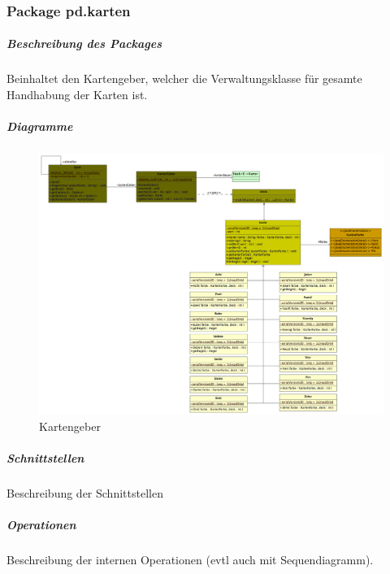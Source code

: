 \documentclass[a4paper,12pt,halfparskip,DIV14]{scrartcl}
\begin{document}
\subsubsection{Package pd.karten} %
\label{ssub:package_pd_karten}
\subparagraph{Beschreibung des Packages} %
\label{ssub:beschreibung_des_packages}
Beinhaltet den Kartengeber, welcher die Verwaltungsklasse für gesamte Handhabung der Karten ist.
\subparagraph{Diagramme} %
\label{ssub:diagramme}
\begin{figure}
	[htp] \centering 
	\includegraphics[width=1\textwidth]{pd_kartengeber.png} \caption{Kartengeber}\label{fig:pd_kartengeber.png} 
\end{figure}
\subparagraph{Schnittstellen} %
\label{ssub:schnittstellen}
Beschreibung der Schnittstellen
\subparagraph{Operationen} %
\label{ssub:operationen}
Beschreibung der internen Operationen (evtl auch mit Sequendiagramm).

\newpage
\end{document}
